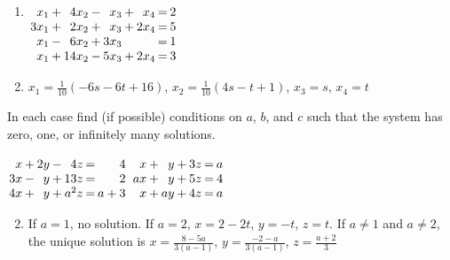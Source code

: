 \begin{multicols}{2}
\begin{supex}
\begin{enumerate}[label={\alph*.}]
\item 
$\arraycolsep=1pt
\begin{array}[t]{rlrlrlrcr}
	  x_1 & + &  4x_2 & - &   x_3 & + &   x_4 & = &  2 \\
	 3x_1 & + &  2x_2 & + &   x_3 & + &  2x_4 & = &  5 \\
	  x_1 & - &  6x_2 & + &  3x_3 &   &       & = &  1 \\
	  x_1 & + & 14x_2 & - &  5x_3 & + &  2x_4 & = &  3 \\
\end{array}$

\end{enumerate}
\begin{supsol}
\begin{enumerate}[label={\alph*.}]
\setcounter{enumi}{1}
\item  
\hspace*{0em}\newline $x_1 = \frac{1}{10}(-6s - 6t + 16)$, $x_2 = \frac{1}{10}(4s - t + 1)$, $x_3 = s$, $x_4 = t$

\end{enumerate}
\end{supsol}
\end{supex}

\begin{supex}
In each case find (if possible) conditions on $a$, $b$, and $c$ such that the system has zero, one, or infinitely many solutions.
\begin{exenumerate}
\exitem 
$\arraycolsep=1pt
\begin{array}[t]{rlrlrcr}
	  x & + &  2y & - &  4z & = &  4 \\
	 3x & - &   y & + & 13z & = &  2 \\
	 4x & + &   y & + & a^2z & = & a + 3 \\
\end{array}$
\exitem 
$\arraycolsep=1pt
\begin{array}[t]{rlrlrcr}
	  x & + &   y & + &  3z & = &  a \\
	 ax & + &   y & + &  5z & = &  4 \\
	  x & + &  ay & + &  4z & = &  a 
\end{array}$
\end{exenumerate}
\begin{supsol} 
\begin{enumerate} [label={\alph*.}]
	\setcounter{enumi}{1}
	\item If $a = 1$, no solution. If $a = 2$, $x = 2 - 2t$, $y =
          -t$, $z = t$. If $a \neq 1$ and $a \neq 2$, the unique
          solution is $x = \frac{8 - 5a}{3(a - 1)}$, $y = \frac{-2 - a}{3(a - 1)}$, $z = \frac{a + 2}{3}$
\end{enumerate}	
\end{supsol}
\end{supex}


\end{multicols}
